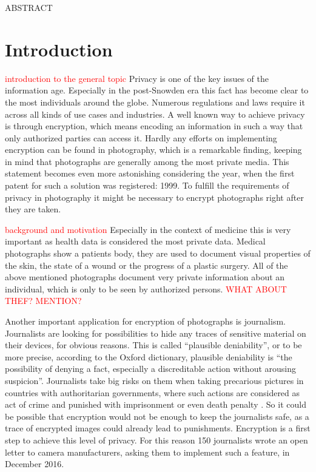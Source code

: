 \documentclass[12pt,a4paper,titlepage,oneside]{scrartcl}
\newcommand\todo[1]{\textcolor{red}{#1}}
\begin{document}
\maketitle
\setcounter{section}{0}
\setcounter{tocdepth}{2}
\tableofcontents
\newpage

ABSTRACT

\section{Introduction}

\todo{introduction to the general topic}
Privacy is one of the key issues of the information age.
Especially in the post-Snowden era this fact has become clear to the most individuals around the globe. 
Numerous regulations and laws \cite{EHG2015, DSG2000, ELGA2012, EuropeanParliament2016, EuropeanCourtofHumanRights2010} require it across all kinds of use cases and industries.
A well known way to achieve privacy is through encryption, which means encoding an information in such a way that only authorized parties can access it. 
Hardly any efforts on implementing encryption can be found in photography, which is a remarkable finding, keeping in mind that photographs are generally among the most private media.
This statement becomes even more astonishing considering the year, when the first patent for such a solution was registered: 1999. \cite{steinberg1999method}
To fulfill the requirements of privacy in photography it might be necessary to encrypt photographs right after they are taken.

\todo{background and motivation}
Especially in the context of medicine this is very important as health data is considered the most private data. \cite{williams2013}
Medical photographs show a patients body, they are used to document visual properties of the skin, the state of a wound or the progress of a plastic surgery. 
All of the above mentioned photographs document very private information about an individual, which is only to be seen by authorized persons. \todo{WHAT ABOUT THEF? MENTION?}

Another important application for encryption of photographs is journalism.
Journalists are looking for possibilities to hide any traces of sensitive material on their devices, for obvious reasons.
This is called ``plausible deniability'', or to be more precise, according to the Oxford dictionary, plausible deniability is ``the possibility of denying a fact, especially a discreditable action without arousing suspicion''.\cite{OxforddictPlausibleDen}
Journalists take big risks on them when taking precarious pictures in countries with authoritarian governments, where such actions are considered as act of crime and punished with imprisonment or even death penalty \cite{Amnesty2016}.
So it could be possible that encryption would not be enough to keep the journalists safe, as a trace of encrypted images could already lead to punishments.
Encryption is a first step to achieve this level of privacy.
For this reason 150 journalists wrote an open letter to camera manufacturers, asking them to implement such a feature, in December 2016.\cite{fp2016}
\end{document}
